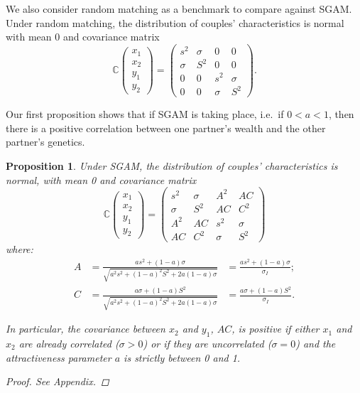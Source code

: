 \documentclass[
]{article}
\newtheorem{proposition}{Proposition}
\theoremstyle{definition}
\theoremstyle{definition}
\theoremstyle{definition}
\theoremstyle{definition}
\theoremstyle{remark}
\begin{document}
We also consider random matching as a benchmark to compare against SGAM. Under
random matching, the distribution of couples' characteristics is normal with
mean 0 and covariance matrix
\[
\mathbb{C}\left( 
\begin{array}{c}
x_{1} \\ 
x_{2} \\ 
y_{1} \\ 
y_{2}%
\end{array}%
\right) =\allowbreak \left( 
\begin{array}{cccc}
s^{2} & \sigma & 0 & 0 \\ 
\sigma & S^{2} & 0 & 0 \\ 
0 & 0 & s^{2} & \sigma \\ 
0 & 0 & \sigma & S^{2}%
\end{array}%
\right). \allowbreak 
\]

Our first proposition shows that if SGAM is taking place, i.e.~if \(0 < a < 1\), then
there is a positive correlation between one partner's wealth and the other
partner's genetics.

\begin{proposition}\label{prop-couples-SGAM}
Under SGAM, the distribution of couples' characteristics is normal, with mean 0
and covariance matrix
\begin{equation}\label{cov-couples-SGAM}
\mathbb{C}\left( 
\begin{array}{c}
x_{1} \\ 
x_{2} \\ 
y_{1} \\ 
y_{2}%
\end{array}%
\right) =\allowbreak \left( 
\begin{array}{cccc}
s^{2} & \sigma  & A^{2} & AC \\ 
\sigma  & S^{2} & AC & C^{2} \\ 
A^{2} & AC & s^{2} & \sigma  \\ 
AC & C^{2} & \sigma  & S^{2}%
\end{array}%
\right) \allowbreak 
\end{equation}
where:
\begin{align*}
A &= \frac{as^{2}+\left( 1-a\right) \sigma }{\sqrt{a^{2}s^{2}+\left(
1-a\right) ^{2}S^{2}+2a\left( 1-a\right) \sigma }} &= \frac{as^{2}+\left( 1-a\right) \sigma }{\sigma_I}; \\
C &= \frac{a\sigma +\left( 1-a\right) S^{2}}{\sqrt{a^{2}s^{2}+\left(
1-a\right) ^{2}S^{2}+2a\left( 1-a\right) \sigma }} &= \frac{a\sigma +\left( 1-a\right) S^{2}}{\sigma_I}.
\end{align*}

In particular, the covariance between $x_2$ and $y_1$, $AC$, is positive if
either $x_1$ and $x_2$ are already correlated ($\sigma > 0$) or if they are
uncorrelated ($\sigma = 0$) and the attractiveness parameter $a$ is strictly
between 0 and 1.

\begin{proof}
See Appendix.
\end{proof}
\end{proposition}
\end{document}
